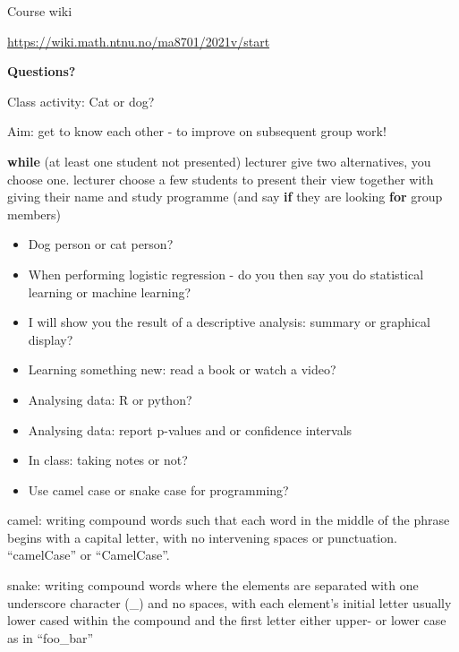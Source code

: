 \documentclass[
  ignorenonframetext,
]{beamer}
\newenvironment{Shaded}{\begin{snugshade}}{\end{snugshade}}
\newcommand{\ControlFlowTok}[1]{\textcolor[rgb]{0.13,0.29,0.53}{\textbf{#1}}}
\newcommand{\NormalTok}[1]{#1}
\providecommand{\tightlist}{%
  \setlength{\itemsep}{0pt}\setlength{\parskip}{0pt}}
\begin{document}
\begin{frame}{Course wiki}
\protect\hypertarget{course-wiki}{}

\url{https://wiki.math.ntnu.no/ma8701/2021v/start}

\textbf{Questions?}

\end{frame}

\begin{frame}[fragile]{Class activity: Cat or dog?}
\protect\hypertarget{class-activity-cat-or-dog}{}

Aim: get to know each other - to improve on subsequent group work!

\begin{Shaded}
\begin{Highlighting}[]
\ControlFlowTok{while}\NormalTok{ (at least one student not presented) }
\NormalTok{   lecturer give two alternatives, you choose one. }
\NormalTok{   lecturer choose a few students to present their view }
\NormalTok{   together with giving their name and study programme }
\NormalTok{   (and say }\ControlFlowTok{if}\NormalTok{ they are looking }\ControlFlowTok{for}\NormalTok{ group members)}
\end{Highlighting}
\end{Shaded}

\end{frame}

\begin{frame}

\begin{itemize}
\tightlist
\item
  Dog person or cat person?
\item
  When performing logistic regression - do you then say you do
  statistical learning or machine learning?
\item
  I will show you the result of a descriptive analysis: summary or
  graphical display?
\item
  Learning something new: read a book or watch a video?
\item
  Analysing data: R or python?
\item
  Analysing data: report p-values and or confidence intervals
\item
  In class: taking notes or not?
\item
  Use camel case or snake case for programming?
\end{itemize}

camel: writing compound words such that each word in the middle of the
phrase begins with a capital letter, with no intervening spaces or
punctuation. ``camelCase'' or ``CamelCase''.

snake: writing compound words where the elements are separated with one
underscore character (\_) and no spaces, with each element's initial
letter usually lower cased within the compound and the first letter
either upper- or lower case as in ``foo\_bar''

\end{frame}
\end{document}
